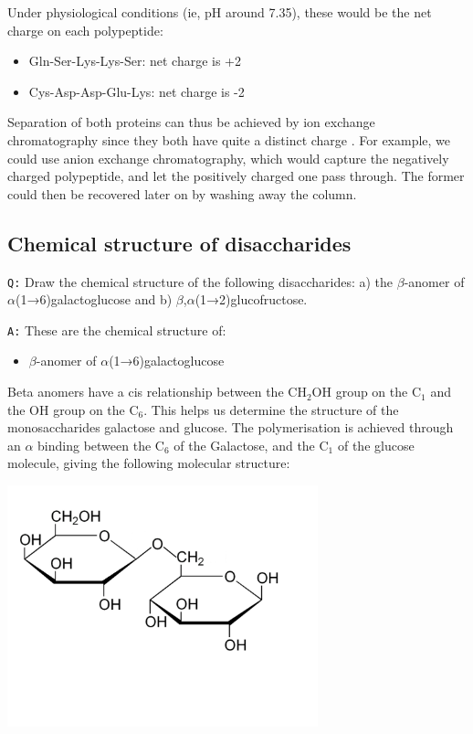 \documentclass[11pt, a4paper,titlepage]{article}
\begin{document}
Under physiological conditions (ie, pH around 7.35), these would be
the net charge on each polypeptide:

\begin{itemize}
\item Gln-Ser-Lys-Lys-Ser: net charge is +2

\item Cys-Asp-Asp-Glu-Lys: net charge is -2

\end{itemize}

Separation of both proteins can thus be achieved by ion exchange
chromatography since they both have quite a distinct charge
\cite{BioChemPrinciples}. For example, we could use anion exchange
chromatography, which would capture the negatively charged
polypeptide, and let the positively charged one pass through. The
former could then be recovered later on by washing away the column.
\subsection{Chemical structure of disaccharides}
\label{sec-2-3}

\texttt{Q:} Draw the chemical structure of the following disaccharides: a)
the $\beta$-anomer of $\alpha$(1→6)galactoglucose and b)
$\beta$,$\alpha$(1→2)glucofructose.

\texttt{A:} These are the chemical structure of:
\begin{itemize}
\item $\beta$-anomer of $\alpha$(1→6)galactoglucose
\end{itemize}

Beta anomers have a cis relationship between the CH$_{2}$OH group on
the C$_{1}$ and the OH group on the C$_{6}$. This helps us determine the
structure of the monosaccharides galactose and glucose. The
polymerisation is achieved through an $\alpha$ binding between the
C$_{6}$ of the Galactose, and the C$_{1}$ of the glucose molecule, giving
the following molecular structure:

\includegraphics[width=9cm]{./Figures/B-A(1-6)GalactoGlucose.pdf}
\end{document}
